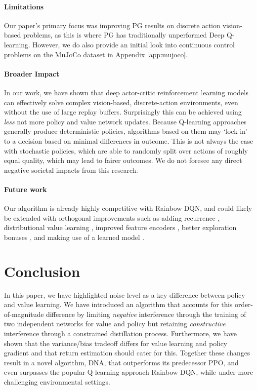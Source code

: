 \documentclass{article}
\begin{document}
\paragraph{Limitations}

Our paper's primary focus was improving PG results on discrete action vision-based problems, as this is where PG has traditionally unperformed Deep Q-learning. However, we do also provide an initial look into continuous control problems on the MuJoCo \cite{todorov2012mujoco} dataset in Appendix \ref{app:mujoco}.

\paragraph{Broader Impact}

In our work, we have shown that deep actor-critic reinforcement learning models can effectively solve complex vision-based, discrete-action environments, even without the use of large replay buffers. Surprisingly this can be achieved using \textit{less} not more policy and value network updates. Because Q-learning approaches generally produce deterministic policies, algorithms based on them may `lock in' to a decision based on minimal differences in outcome. This is not always the case with stochastic policies, which are able to randomly split over actions of roughly equal quality, which may lead to fairer outcomes. We do not foresee any direct negative societal impacts from this research. 

\paragraph{Future work} Our algorithm is already highly competitive with Rainbow DQN, and could likely be extended with orthogonal improvements such as adding recurrence \cite{hausknecht2015deep}, distributional value learning \cite{bellemare2017distributional}, improved feature encoders \cite{espeholt2018impala}, better exploration bonuses \cite{burda2018exploration}, and making use of a learned model \cite{schrittwieser2020mastering}. 

\section{Conclusion}



In this paper, we have highlighted noise level as a key difference between policy and value learning. We have introduced an algorithm that accounts for this order-of-magnitude difference by limiting \textit{negative} interference through the training of two independent networks for value and policy but retaining \textit{constructive} interference through a constrained distillation process. Furthermore, we have shown that the variance/bias tradeoff differs for value learning and policy gradient and that return estimation should cater for this. Together these changes result in a novel algorithm, DNA, that outperforms its predecessor PPO, and even surpasses the popular Q-learning approach Rainbow DQN, while under more challenging environmental settings.
\end{document}
